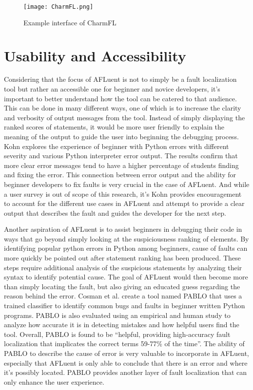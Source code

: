 \begin{figure}[!htb]
	\begin{center}
		\texttt{[image: CharmFL.png]}
		\caption{\label{fig:charmfl} Example interface of CharmFL \cite{sarhan2021charmfl}}
	\end{center}
\end{figure}

\section{Usability and Accessibility}
\label{sec:usability_accessibility}

Considering that the focus of AFLuent is not to simply be a fault localization
tool but rather an accessible one for beginner and novice developers, it's
important to better understand how the tool can be catered to that audience.
This can be done in many different ways, one of which is to increase the clarity
and verbosity of output messages from the tool. Instead of simply displaying the
ranked scores of statements, it would be more user friendly to explain the
meaning of the output to guide the user into beginning the debugging process.
Kohn \cite{kohn2019error} explores the experience of beginner with Python errors
with different severity and various Python interpreter error output. The results
confirm that more clear error messages tend to have a higher percentage of
students finding and fixing the error. This connection between error output and
the ability for beginner developers to fix faults is very crucial in the case of
AFLuent. And while a user survey is out of scope of this research, it's Kohn
provides encouragement to account for the different use cases in AFLuent and
attempt to provide a clear output that describes the fault and guides the
developer for the next step.

Another aspiration of AFLuent is to assist beginners in debugging their code in
ways that go beyond simply looking at the suspiciousness ranking of elements. By
identifying popular python errors in Python among beginners, cause of faults can
more quickly be pointed out after statement ranking has been produced. These
steps require additional analysis of the suspicious statements by analyzing
their syntax to identify potential cause. The goal of AFLuent would then become
more than simply locating the fault, but also giving an educated guess regarding
the reason behind the error. Cosman et al. \cite{cosman2020pablo} create a tool
named PABLO that uses a trained classifier to identify common bugs and faults in
beginner written Python programs. PABLO is also evaluated using an empirical and
human study to analyze how accurate it is in detecting mistakes and how helpful
users find the tool. Overall, PABLO is found to be ``helpful, providing
high-accuracy fault localization that implicates the correct terms
59-77\% of the time''. The ability of PABLO to describe the cause of error is
very valuable to incorporate in AFLuent, especially that AFLuent is only able to
conclude that there is an error and where it's possibly located. PABLO provides
another layer of fault localization that can only enhance the user experience.
